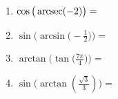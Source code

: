 \documentclass{ximera}
\begin{document}
\begin{exercise}
\begin{enumerate}
\begin{multipleChoice}
	\choice{$\pi$}
\end{multipleChoice}
%
\item $\cos\big(\operatorname{arcsec}(-2)\big) =$ 
\begin{multipleChoice}
\end{multipleChoice}
%
\item $\sin\!\Big(\arcsin\!\Big(\!-\frac{1}{2}\Big)\Big) = $
\begin{multipleChoice}
\end{multipleChoice}
%
\item $\arctan\!\Big(\tan\!\Big(\frac{7\pi}{4}\Big)\Big) = $
\begin{multipleChoice}
	\choice{$\pi$}
\end{multipleChoice}
%
\item $\sin\big(\arctan(\frac{\sqrt{3}}{3})\big) = $
\begin{multipleChoice}
\end{multipleChoice}
%
\end{enumerate}
\end{exercise}
\end{document}
